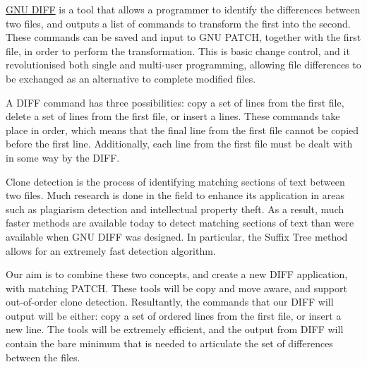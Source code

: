 \href{http://www.gnu.org/software/diffutils/}{GNU DIFF} is a tool that allows a programmer to identify the differences between two files, and outputs a list of commands to transform the first into the second.
These commands can be saved and input to GNU PATCH, together with the first file, in order to perform the transformation.
This is basic change control, and it revolutionised both single and multi-user programming, allowing file differences to be exchanged as an alternative to complete modified files.

A DIFF command has three possibilities: copy a set of lines from the first file, delete a set of lines from the first file, or insert a lines.
These commands take place in order, which means that the final line from the first file cannot be copied before the first line.
Additionally, each line from the first file must be dealt with in some way by the DIFF.

Clone detection is the process of identifying matching sections of text between two files.
Much research is done in the field to enhance its application in areas such as plagiarism detection and intellectual property theft.
As a result, much faster methods are available today to detect matching sections of text than were available when GNU DIFF was designed.
In particular, the Suffix Tree method allows for an extremely fast detection algorithm.

Our aim is to combine these two concepts, and create a new DIFF application, with matching PATCH.
These tools will be copy and move aware, and support out-of-order clone detection.
Resultantly, the commands that our DIFF will output will be either: copy a set of ordered lines from the first file, or insert a new line.
The tools will be extremely efficient, and the output from DIFF will contain the bare minimum that is needed to articulate the set of differences between the files.
